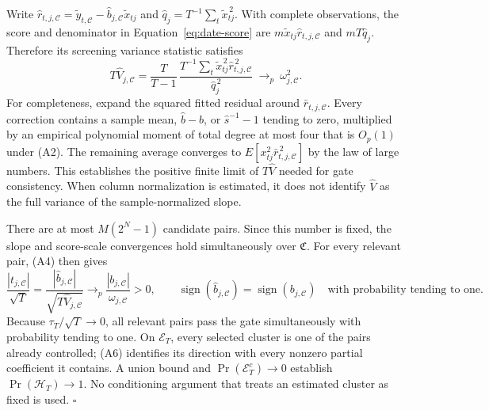 \documentclass[11pt,a4paper]{article}
\begin{document}
Write
$\widehat r_{t,j,\mathcal C}
 =\widetilde y_{t,\mathcal C}
 -\widehat b_{j,\mathcal C}\widetilde x_{tj}$ and
$\widehat q_j=T^{-1}\sum_t\widetilde x_{tj}^{\,2}$.
With complete observations, the score and denominator in
Equation~\eqref{eq:date-score} are
$m\widetilde x_{tj}\widehat r_{t,j,\mathcal C}$ and
$mT\widehat q_j$. Therefore its screening variance statistic satisfies
\begin{equation}\label{eq:sandwich-lln}
 T\widehat V_{j,\mathcal C}
 =\frac{T}{T-1}\,
 \frac{T^{-1}\sum_t\widetilde x_{tj}^{\,2}
                 \widehat r_{t,j,\mathcal C}^{\,2}}
      {\widehat q_j^{\,2}}
 \ \longrightarrow_p\ \omega_{j,\mathcal C}^2 .
\end{equation}
For completeness, expand the squared fitted residual around
$\bar r_{t,j,\mathcal C}$. Every correction contains a sample mean,
$\widehat b-b$, or $\widehat s^{-1}-1$ tending to zero, multiplied by
an empirical polynomial moment of total degree at most four that is
$O_p(1)$ under (A2). The remaining average converges to
$E[x_{tj}^2\bar r_{t,j,\mathcal C}^{\,2}]$ by the law of large numbers.
This establishes the positive finite limit of $T\widehat V$ needed for
gate consistency. When column normalization is estimated, it does not
identify $\widehat V$ as the full variance of the sample-normalized slope.

There are at most $M(2^N-1)$ candidate pairs. Since this number is fixed,
the slope and score-scale convergences hold simultaneously over
$\mathfrak C$. For every relevant pair, (A4) then gives
\[
 \frac{|t_{j,\mathcal C}|}{\sqrt T}
 =\frac{|\widehat b_{j,\mathcal C}|}
        {\sqrt{T\widehat V_{j,\mathcal C}}}
 \longrightarrow_p \frac{|b_{j,\mathcal C}|}{\omega_{j,\mathcal C}}>0,
 \qquad
 \operatorname{sign}(\widehat b_{j,\mathcal C})
 =\operatorname{sign}(b_{j,\mathcal C})
 \quad\text{with probability tending to one}.
\]
Because $\tau_T/\sqrt T\to0$, all relevant pairs pass the gate simultaneously
with probability tending to one. On $\mathcal E_T$, every selected cluster is
one of the pairs already controlled; (A6) identifies its direction with every
nonzero partial coefficient it contains. A union bound and
$\Pr(\mathcal E_T^c)\to0$ establish $\Pr(\mathcal H_T)\to1$.
No conditioning argument that treats an estimated cluster as fixed is used.
\hfill$\square$
\end{document}
